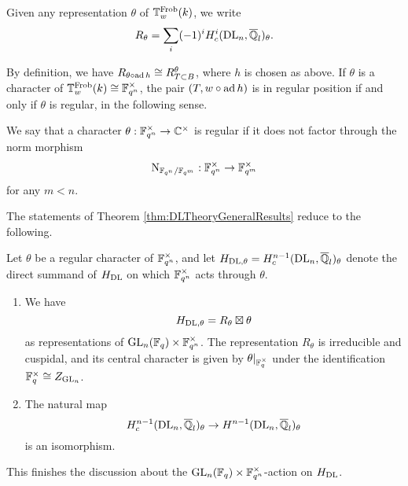 \documentclass[../main.tex]{subfiles}
\begin{document}
Given any representation $\theta$ of $\mathbb{T}^{\mathrm{Frob}}_w(k)$, we write
\begin{equation*}
  R_\theta = \sum_i (-1)^i H_c^i(\mathrm{DL}_n, \overline {\mathbb{Q}}_l)_\theta.
\end{equation*}

By definition, we have $R_{\theta \circ \operatorname{ad} h} \cong R^\theta_{T\subset B}$,
where $h$ is chosen as above. If $\theta$ is a
character of $\mathbb{T}_w^{\mathrm{Frob}}(k) \cong \mathbb{F}_{q^n}^\times$, the pair $(T, w \circ \operatorname{ad}
h)$ is in regular position if and only if $\theta$ is regular, in the following
sense.

\begin{defi}
  We say that a character $\theta: \mathbb{F}_{q^n}^\times \to \mathbb{C}^\times$ is 
  regular if it does not factor through the norm morphism
  $$\mathrm{N}_{\mathbb{F}_{q^n}/\mathbb{F}_{q^m}}:\mathbb{F}_{q^n}^\times \to \mathbb{F}_{q^m}^\times$$ 
  for any $m < n$.
\end{defi}


The statements of Theorem \ref{thm:DLTheoryGeneralResults} reduce to
the following.

\begin{thm}\label{thm:DLCorrespondenceForUs}
  Let $\theta$ be a regular character of $\mathbb{F}_{q^n}^\times$, and let
  $H_{\mathrm{DL},\theta} = H^{n-1}_c(\mathrm{DL}_n, \overline {\mathbb{Q}}_l)_\theta$ denote the direct
  summand of $H_\mathrm{DL}$ on which $\mathbb{F}_{q^n}^\times$
  acts through $\theta$. 
  \begin{enumerate}
    \item We have
      \begin{equation*}
        H_{\mathrm{DL},\theta} = R_\theta \boxtimes
        \theta
      \end{equation*}
      as representations of $\operatorname{GL}_n(\mathbb{F}_q) \times \mathbb{F}_{q^n}^\times$.
      The representation $R_\theta$ is irreducible and cuspidal, and its central
      character is given by $\theta|_{\mathbb{F}_q^\times}$ under the identification
      $\mathbb{F}_q^\times \cong Z_{\operatorname{GL}_n}$.
    \item The natural map 
      \begin{equation*}
        H^{n-1}_c(\mathrm{DL}_n, \overline {\mathbb{Q}}_l)_\theta \to
        H^{n-1}(\mathrm{DL}_n, \overline {\mathbb{Q}}_l)_\theta
      \end{equation*}
      is an isomorphism.
  \end{enumerate}
\end{thm}

This finishes the discussion about the $\operatorname{GL}_n(\mathbb{F}_q) \times \mathbb{F}_{q^n}^\times$-action
on $H_{\mathrm{DL}}$. 
\end{document}
